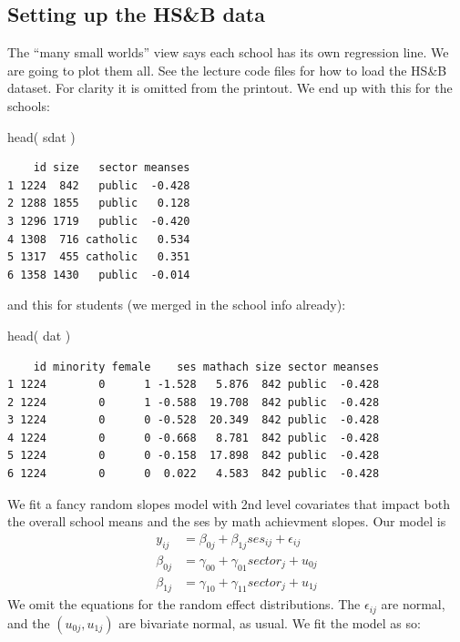\documentclass[
  letterpaper,
  DIV=11,
  numbers=noendperiod]{scrreprt}
\newenvironment{Shaded}{}{}
\newcommand{\FunctionTok}[1]{\textcolor[rgb]{0.02,0.16,0.49}{#1}}
\newcommand{\NormalTok}[1]{#1}
\begin{document}
\subsection{Setting up the HS\&B data}\label{setting-up-the-hsb-data}

The ``many small worlds'' view says each school has its own regression
line. We are going to plot them all. See the lecture code files for how
to load the HS\&B dataset. For clarity it is omitted from the printout.
We end up with this for the schools:

\begin{Shaded}
\begin{Highlighting}[]
\FunctionTok{head}\NormalTok{( sdat )}
\end{Highlighting}
\end{Shaded}

\begin{verbatim}
    id size   sector meanses
1 1224  842   public  -0.428
2 1288 1855   public   0.128
3 1296 1719   public  -0.420
4 1308  716 catholic   0.534
5 1317  455 catholic   0.351
6 1358 1430   public  -0.014
\end{verbatim}

and this for students (we merged in the school info already):

\begin{Shaded}
\begin{Highlighting}[]
\FunctionTok{head}\NormalTok{( dat )}
\end{Highlighting}
\end{Shaded}

\begin{verbatim}
    id minority female    ses mathach size sector meanses
1 1224        0      1 -1.528   5.876  842 public  -0.428
2 1224        0      1 -0.588  19.708  842 public  -0.428
3 1224        0      0 -0.528  20.349  842 public  -0.428
4 1224        0      0 -0.668   8.781  842 public  -0.428
5 1224        0      0 -0.158  17.898  842 public  -0.428
6 1224        0      0  0.022   4.583  842 public  -0.428
\end{verbatim}

We fit a fancy random slopes model with 2nd level covariates that impact
both the overall school means and the ses by math achievment slopes. Our
model is \[
\begin{aligned}
y_{ij} &= \beta_{0j} + \beta_{1j} ses_{ij} +  \epsilon_{ij} \\
\beta_{0j} &= \gamma_{00} + \gamma_{01} sector_j + u_{0j} \\
\beta_{1j} &= \gamma_{10} + \gamma_{11} sector_j + u_{1j} 
\end{aligned}
\] We omit the equations for the random effect distributions. The
\(\epsilon_{ij}\) are normal, and the \((u_{0j},u_{1j})\) are bivariate
normal, as usual. We fit the model as so:
\end{document}

